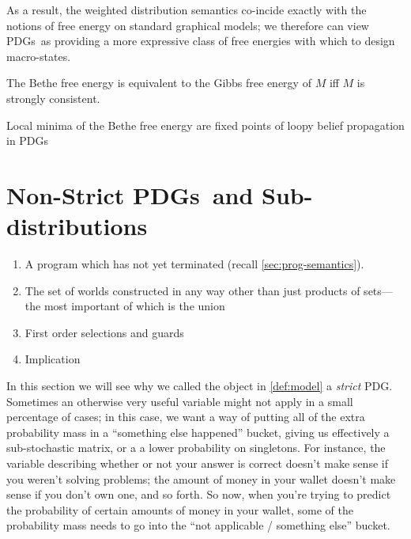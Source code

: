 \documentclass{article}
\newcommand{\MN}{PDG}
\newcommand{\MNs}{\MN s}
\begin{document}
	As a result, the weighted distribution semantics co-incide exactly with the notions of free energy on standard graphical models; we therefore can view \MNs\ as providing a more expressive class of free energies with which to design macro-states.
	
	\begin{conj}
		The Bethe free energy is equivalent to the Gibbs free energy of $M$ iff $M$ is strongly consistent.
	\end{conj}
	\begin{coro}
		Local minima of the Bethe free energy are fixed points of loopy belief propagation in \MNs		
	\end{coro}

	

		

	\section{Non-Strict \MNs\ and Sub-distributions} \label{sec:full-model}
	
	
	\begin{enumerate}
		\item A program which has not yet terminated (recall \cref{sec:prog-semantics}).
		\item The set of worlds constructed in any way other than just products of sets---the most important of which is the union
		\item First order selections and guards
		\item Implication
	\end{enumerate}
	
	
	
	In this section we will see why we called the object in \cref{def:model} a \textit{strict} \MN.	
	Sometimes an otherwise very useful variable might not apply in a small percentage of cases; in this case, we want a way of putting all of the extra probability mass in a ``something else happened'' bucket, giving us effectively a sub-stochastic matrix, or a a lower probability on singletons. For instance, the variable describing whether or not your answer is correct doesn't make sense if you weren't solving problems; the amount of money in your wallet doesn't make sense if you don't own one, and so forth. So now, when you're trying to predict the probability of certain amounts of money in your wallet, some of the probability mass needs to go into the ``not applicable / something else'' bucket. 
	
\end{document}
